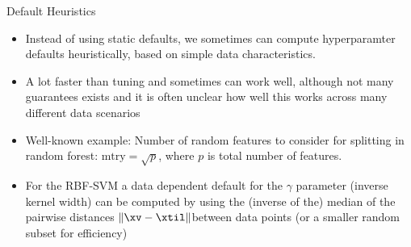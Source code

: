 \documentclass[11pt,compress,t,notes=noshow, xcolor=table]{beamer}
\begin{document}
\begin{frame}{Default Heuristics}

    \begin{itemize}
            \item Instead of using static defaults, we sometimes can compute hyperparamter defaults heuristically, based on simple data characteristics.
            \item A lot faster than tuning and sometimes can work well,
                although not many guarantees exists and it is often unclear how well this works across many different data scenarios
            \item Well-known example: Number of random features to consider for splitting in random forest: $\text{mtry} = \sqrt{p}$, where $p$ is total number of features.
            \item For the RBF-SVM a data dependent default for the $\gamma$ parameter (inverse kernel width) can be computed by using the (inverse of the) median of the pairwise distances $\|\xv-\xtil\|$between data points (or a smaller random subset for efficiency)
    \end{itemize}
\end{frame}
\end{document}
